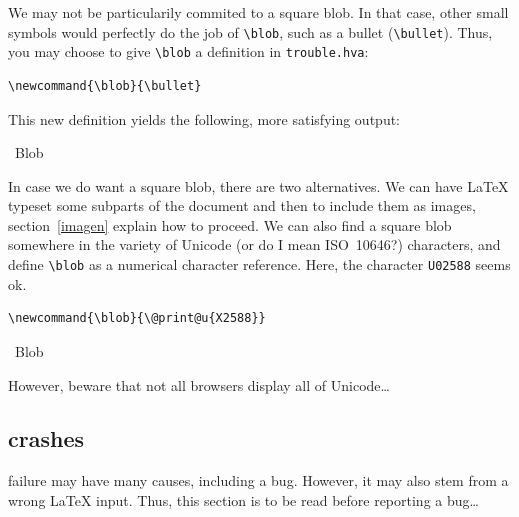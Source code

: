 We may not be particularily commited to a square blob.
In that case, other small symbols would perfectly do the job
of \verb+\blob+, such as a bullet (\verb+\bullet+).
Thus, you may choose to give \verb+\blob+ a definition in
\verb+trouble.hva+:
\begin{verbatim}
\newcommand{\blob}{\bullet}
\end{verbatim}
This new definition yields the following, more satisfying output:
\begin{htmlout}\newcommand{\blob}{\bullet}%
\begin{htmlonly}%
\blob\ Blob \blob
\end{htmlonly}
\begin{latexonly}\vspace*{.5ex}
%
\end{latexonly}%
\end{htmlout}

\label{square:blob}
%
In case we do want a square blob, there are two alternatives.
We can have \LaTeX{} typeset some subparts of
the document and then to include them as images, section~\ref{imagen}
explain how to proceed.
We can also find a square blob somewhere in the variety of Unicode
(or do I mean ISO~10646?) characters,
and define \verb+\blob+ as a numerical
character reference. Here, the character \texttt{U02588}
seems ok.
\begin{verbatim}
\newcommand{\blob}{\@print@u{X2588}}
\end{verbatim}
\begin{htmlout}%
\begin{htmlonly}\newcommand{\blob}{}%
\blob\ Blob \blob
\end{htmlonly}
\begin{latexonly}\vspace*{.5ex}
%
\end{latexonly}%
\end{htmlout}
However, beware that not all browsers display all of Unicode\ldots


\subsection{\hevea{} crashes}

\hevea{} failure may have many causes, including a bug.
However, it may also stem from a wrong \LaTeX{} input.
Thus, this section is to be read before reporting a bug\ldots

